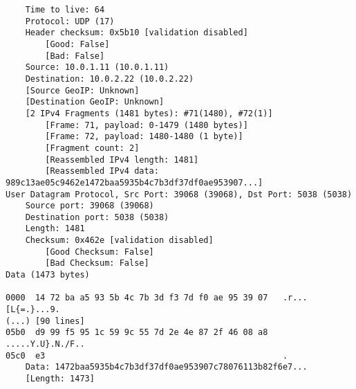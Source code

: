 \begin{lstlisting}
    Time to live: 64
    Protocol: UDP (17)
    Header checksum: 0x5b10 [validation disabled]
        [Good: False]
        [Bad: False]
    Source: 10.0.1.11 (10.0.1.11)
    Destination: 10.0.2.22 (10.0.2.22)
    [Source GeoIP: Unknown]
    [Destination GeoIP: Unknown]
    [2 IPv4 Fragments (1481 bytes): #71(1480), #72(1)]
        [Frame: 71, payload: 0-1479 (1480 bytes)]
        [Frame: 72, payload: 1480-1480 (1 byte)]
        [Fragment count: 2]
        [Reassembled IPv4 length: 1481]
        [Reassembled IPv4 data: 989c13ae05c9462e1472baa5935b4c7b3df37df0ae953907...]
User Datagram Protocol, Src Port: 39068 (39068), Dst Port: 5038 (5038)
    Source port: 39068 (39068)
    Destination port: 5038 (5038)
    Length: 1481
    Checksum: 0x462e [validation disabled]
        [Good Checksum: False]
        [Bad Checksum: False]
Data (1473 bytes)

0000  14 72 ba a5 93 5b 4c 7b 3d f3 7d f0 ae 95 39 07   .r...[L{=.}...9.
(...) [90 lines]
05b0  d9 99 f5 95 1c 59 9c 55 7d 2e 4e 87 2f 46 08 a8   .....Y.U}.N./F..
05c0  e3                                                .
    Data: 1472baa5935b4c7b3df37df0ae953907c78076113b82f6e7...
    [Length: 1473]
\end{lstlisting}
